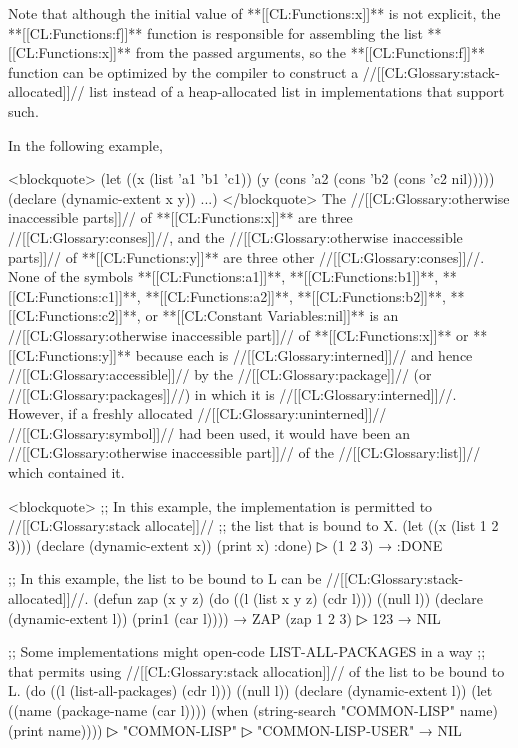Note that although the initial value of **[[CL:Functions:x]]** is not explicit, the **[[CL:Functions:f]]** function is responsible for assembling the list **[[CL:Functions:x]]** from the passed arguments, so the **[[CL:Functions:f]]** function can be optimized by the compiler to construct a //[[CL:Glossary:stack-allocated]]// list instead of a heap-allocated list in implementations that support such.

In the following example,

<blockquote> (let ((x (list 'a1 'b1 'c1)) (y (cons 'a2 (cons 'b2 (cons 'c2 nil))))) (declare (dynamic-extent x y)) ...) </blockquote> The //[[CL:Glossary:otherwise inaccessible parts]]// of **[[CL:Functions:x]]** are three //[[CL:Glossary:conses]]//, and the //[[CL:Glossary:otherwise inaccessible parts]]// of **[[CL:Functions:y]]** are three other //[[CL:Glossary:conses]]//. None of the symbols **[[CL:Functions:a1]]**, **[[CL:Functions:b1]]**, **[[CL:Functions:c1]]**, **[[CL:Functions:a2]]**, **[[CL:Functions:b2]]**, **[[CL:Functions:c2]]**, or **[[CL:Constant Variables:nil]]** is an //[[CL:Glossary:otherwise inaccessible part]]// of **[[CL:Functions:x]]** or **[[CL:Functions:y]]** because each is //[[CL:Glossary:interned]]// and hence //[[CL:Glossary:accessible]]// by the //[[CL:Glossary:package]]// (or //[[CL:Glossary:packages]]//) in which it is //[[CL:Glossary:interned]]//. However, if a freshly allocated //[[CL:Glossary:uninterned]]// //[[CL:Glossary:symbol]]// had been used, it would have been an //[[CL:Glossary:otherwise inaccessible part]]// of the //[[CL:Glossary:list]]// which contained it.

<blockquote> ;; In this example, the implementation is permitted to //[[CL:Glossary:stack allocate]]// ;; the list that is bound to X. (let ((x (list 1 2 3))) (declare (dynamic-extent x)) (print x) :done)
▷ (1 2 3) → :DONE

;; In this example, the list to be bound to L can be //[[CL:Glossary:stack-allocated]]//. (defun zap (x y z) (do ((l (list x y z) (cdr l))) ((null l)) (declare (dynamic-extent l)) (prin1 (car l)))) → ZAP (zap 1 2 3)
▷ 123 → NIL

;; Some implementations might open-code LIST-ALL-PACKAGES in a way ;; that permits using //[[CL:Glossary:stack allocation]]// of the list to be bound to L. (do ((l (list-all-packages) (cdr l))) ((null l)) (declare (dynamic-extent l)) (let ((name (package-name (car l)))) (when (string-search "COMMON-LISP" name) (print name))))
▷ "COMMON-LISP"
▷ "COMMON-LISP-USER" → NIL

